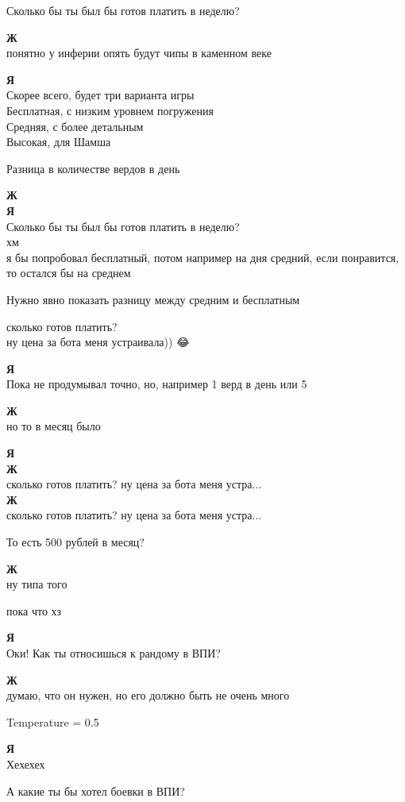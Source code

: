 \begin{tabbing}
Сколько бы ты был бы готов платить в неделю?

\textbf{Ж} \\
понятно
у инферии опять будут чипы в каменном веке

\textbf{Я} \\
Скорее всего, будет три варианта игры \\
Бесплатная, с низким уровнем погружения \\
Средняя, с более детальным \\
Высокая, для Шамша

Разница в количестве вердов в день

\textbf{Ж} \\
\textbf{Я} \\
Сколько бы ты был бы готов платить в неделю? \\
хм \\
я бы попробовал бесплатный, потом например на дня средний, если понравится, то остался бы на среднем

Нужно явно показать разницу между средним и бесплатным

сколько готов платить? \\
ну цена за бота меня устраивала)) 😂🎅

\textbf{Я} \\
Пока не продумывал точно, но, например 1 верд в день или 5

\textbf{Ж} \\
но то в месяц было

\textbf{Я} \\
\textbf{Ж} \\
сколько готов платить? ну цена за бота меня устра...\\
\textbf{Ж} \\
сколько готов платить? ну цена за бота меня устра...

То есть 500 рублей в месяц?

\textbf{Ж} \\
ну типа того

пока что хз

\textbf{Я} \\
Оки! Как ты относишься к рандому в ВПИ?

\textbf{Ж} \\
думаю, что он нужен, но его должно быть не очень много

Temperature = 0.5

\textbf{Я} \\
Хехехех

А какие ты бы хотел боевки в ВПИ?


\end{tabbing}
